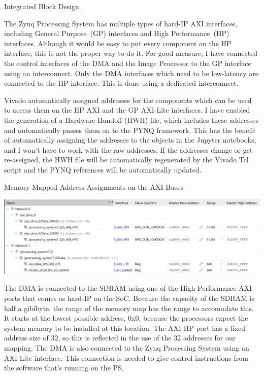 \documentclass{matthijs}
\begin{document}
\begin{hoofdstuk}{Integrated Block Design}
		\bigskip

		The Zynq Processing System has multiple types of hard-IP AXI interfaces, including General Purpose~(GP) interfaces and High Performance~(HP) interfaces.
		Although it would be easy to put every component on the HP interface, this is not the proper way to do it.
		For good measure, I have connected the control interfaces of the DMA and the Image Processor to the GP interface using an interconnect.
		Only the DMA interfaces which need to be low-latency are connected to the HP interface.
		This is done using a dedicated interconnect.

		\bigskip

		Vivado automatically assigned addresses for the components which can be used to access them on the HP AXI and the GP AXI-Lite interfaces.
		I have enabled the generation of a Hardware Handoff (HWH) file, which includes these addresses and automatically passes them on to the PYNQ framework.
		This has the benefit of automatically assigning the addresses to the objects in the Jupyter notebooks, and I won't have to work with the raw addresses.
		If the addresses change or get re-assigned, the HWH file will be automatically regenerated by the Vivado Tcl script and the PYNQ references will be automatically updated.

		\vspace{9pt}
		\begin{figuur}{Memory Mapped Address Assignments on the AXI Buses}

			\centerline{
				\includegraphics[width=1.1\textwidth, clip, trim=2pt 0 0 2pt]{vivado-bd-address-map-bad-quality.png}
			}

		\end{figuur}	
		\vspace{3pt}

		The DMA is connected to the SDRAM using one of the High Performance AXI ports that comes as hard-IP on the SoC.
		Because the capacity of the SDRAM is half a gibibyte, the range of the memory map has the range to accomodate this.
		It starts at the lowest possible address, 0x0, because the processors expect the system memory to be installed at this location.
		The AXI-HP port has a fixed address size of \qty{32}{\bit}, so this is reflected in the use of the \qty{32}{\bit} addresses for our mapping.
		The DMA is also connected to the Zynq Processing System using an AXI-Lite interface.
		This connection is needed to give control instructions from the software that's running on the PS.


\end{hoofdstuk}
\end{document}
